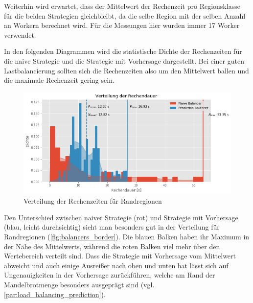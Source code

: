 Weiterhin wird erwartet, dass der Mittelwert der Rechenzeit pro Regionsklasse für die beiden Strategien gleichbleibt, da die selbe Region mit der selben Anzahl an Workern berechnet wird.
Für die Messungen hier wurden immer 17 Worker verwendet.

In den folgenden Diagrammen wird die statistische Dichte der Rechenzeiten für die naive Strategie und die Strategie mit Vorhersage dargestellt.
Bei einer guten Lastbalancierung sollten sich die Rechenzeiten also um den Mittelwert ballen und die maximale Rechenzeit gering sein.

\begin{figure}
	\centering
	\includegraphics[width=0.9\linewidth]{img/Evaluation/balancers/balancers_border.png}
	\caption{Verteilung der Rechenzeiten für Randregionen}
	\label{fig:balancers_border}
\end{figure}

Den Unterschied zwischen naiver Strategie (rot) und Strategie mit Vorhersage (blau, leicht durchsichtig) sieht man besonders gut in der Verteilung für Randregionen (\autoref{fig:balancers_border}).
Die blauen Balken haben ihr Maximum in der Nähe des Mittelwerts, während die roten Balken viel mehr über den Wertebereich verteilt sind.
Dass die Strategie mit Vorhersage vom Mittelwert abweicht und auch einige Ausreißer nach oben und unten hat lässt sich auf Ungenauigkeiten in der Vorhersage zurückführen, welche am Rand der Mandelbrotmenge besonders ausgeprägt sind (vgl. \autoref{par:load_balancing_prediction}).

